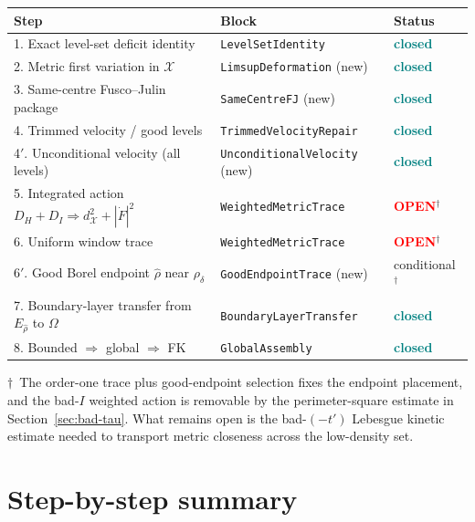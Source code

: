 \documentclass[11pt]{article}
\theoremstyle{definition}
\newcommand{\Om}{\Omega}
\newcommand{\X}{\mathcal X}
\newcommand{\rdel}{\rho_\delta}
\newcommand{\rhad}{\widehat\rho}
\newcommand{\OPEN}{\textcolor{red}{\bf OPEN}}
\newcommand{\CLOSED}{\textcolor{teal}{\bf closed}}
\begin{document}
\begin{center}
\renewcommand{\arraystretch}{1.2}
\begin{tabular}{|l|l|l|}
\hline
\textbf{Step} & \textbf{Block} & \textbf{Status} \\
\hline
1. Exact level-set deficit identity & \texttt{LevelSetIdentity} & \CLOSED \\
2. Metric first variation in $\X$ & \texttt{LimsupDeformation} (new) & \CLOSED \\
3. Same-centre Fusco--Julin package & \texttt{SameCentreFJ} (new) & \CLOSED \\
4. Trimmed velocity / good levels & \texttt{TrimmedVelocityRepair} & \CLOSED \\
4$'$. Unconditional velocity (all levels) & \texttt{UnconditionalVelocity} (new) & \CLOSED \\
5. Integrated action $D_{H}+D_{I}\Rightarrow d_{\X}^{2}+|\dot F|^{2}$ & \texttt{WeightedMetricTrace} & \OPEN $^{\dagger}$ \\
6. Uniform window trace & \texttt{WeightedMetricTrace} & \OPEN $^{\dagger}$ \\
6$'$. Good Borel endpoint $\rhad$ near $\rdel$ & \texttt{GoodEndpointTrace} (new) & conditional $^{\dagger}$ \\
7. Boundary-layer transfer from $E_{\rhad}$ to $\Om$ & \texttt{BoundaryLayerTransfer} & \CLOSED \\
8. Bounded $\Rightarrow$ global $\Rightarrow$ FK & \texttt{GlobalAssembly} & \CLOSED \\
\hline
\end{tabular}
\end{center}

$\dagger$~The order-one trace plus good-endpoint selection fixes the
endpoint placement, and the bad-$I$ weighted action is removable by the
perimeter-square estimate in Section~\ref{sec:bad-tau}.  What remains
open is the bad-$(-t')$ Lebesgue kinetic estimate needed to transport
metric closeness across the low-density set.

\section{Step-by-step summary}\label{sec:step-by-step}
\end{document}
